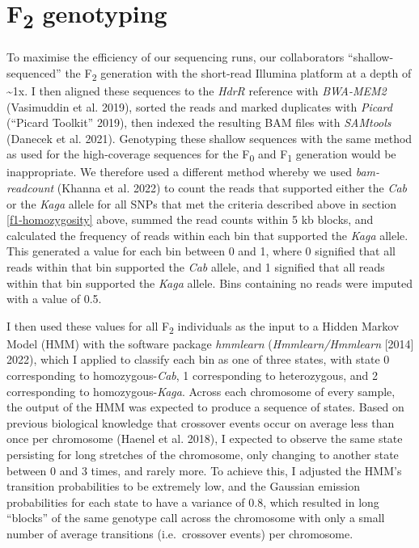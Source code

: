 \documentclass[
]{book}
\begin{document}
\clearpage

\hypertarget{somite-f2-sequencing}{%
\section{\texorpdfstring{F\textsubscript{2} genotyping}{F2 genotyping}}\label{somite-f2-sequencing}}

To maximise the efficiency of our sequencing runs, our collaborators ``shallow-sequenced'' the F\textsubscript{2} generation with the short-read Illumina platform at a depth of \textasciitilde1x. I then aligned these sequences to the \emph{HdrR} reference with \emph{BWA-MEM2} (Vasimuddin et al. 2019), sorted the reads and marked duplicates with \emph{Picard} ({``Picard Toolkit''} 2019), then indexed the resulting BAM files with \emph{SAMtools} (Danecek et al. 2021). Genotyping these shallow sequences with the same method as used for the high-coverage sequences for the F\textsubscript{0} and F\textsubscript{1} generation would be inappropriate. We therefore used a different method whereby we used \emph{bam-readcount} (Khanna et al. 2022) to count the reads that supported either the \emph{Cab} or the \emph{Kaga} allele for all SNPs that met the criteria described above in section \ref{f1-homozygosity} above, summed the read counts within 5 kb blocks, and calculated the frequency of reads within each bin that supported the \emph{Kaga} allele. This generated a value for each bin between 0 and 1, where 0 signified that all reads within that bin supported the \emph{Cab} allele, and 1 signified that all reads within that bin supported the \emph{Kaga} allele. Bins containing no reads were imputed with a value of 0.5.

I then used these values for all F\textsubscript{2} individuals as the input to a Hidden Markov Model (HMM) with the software package \emph{hmmlearn} (\emph{Hmmlearn/Hmmlearn} {[}2014{]} 2022), which I applied to classify each bin as one of three states, with state 0 corresponding to homozygous-\emph{Cab}, 1 corresponding to heterozygous, and 2 corresponding to homozygous-\emph{Kaga}. Across each chromosome of every sample, the output of the HMM was expected to produce a sequence of states. Based on previous biological knowledge that crossover events occur on average less than once per chromosome (Haenel et al. 2018), I expected to observe the same state persisting for long stretches of the chromosome, only changing to another state between 0 and 3 times, and rarely more. To achieve this, I adjusted the HMM's transition probabilities to be extremely low, and the Gaussian emission probabilities for each state to have a variance of 0.8, which resulted in long ``blocks'' of the same genotype call across the chromosome with only a small number of average transitions (i.e.~crossover events) per chromosome.
\end{document}
